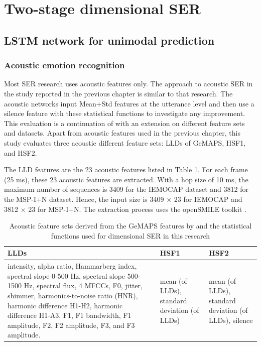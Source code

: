 \section{Two-stage dimensional SER}

\subsection{LSTM network for unimodal prediction}
\subsubsection{Acoustic emotion recognition}

Most SER research uses acoustic features only. The approach to acoustic SER in
the study reported in the previous chapter is similar to that research. The
acoustic networks input Mean+Std features at the utterance level and then use
a silence feature with these statistical functions to investigate any
improvement.  This evaluation is a continuation of \cite{Atmaja2020f} with an
extension on different feature sets and datasets.  Apart from acoustic features
used in the previous chapter, this study evaluates three acoustic different
feature sets: LLDs of GeMAPS, HSF1, and HSF2.

The LLD features are the 23 acoustic features listed in Table
\ref{tab:aco_feature}. For each frame (25 ms), these 23 acoustic features are
extracted. With a hop size of 10 ms, the maximum number of sequences is 3409
for the IEMOCAP dataset and 3812 for the MSP-I+N dataset. Hence, the input size
is 3409 $\times$ 23 for IEMOCAP and 3812 $\times$ 23 for MSP-I+N. The
extraction process uses the openSMILE toolkit \cite{Eyben2016open}.

\begin{table}
\caption{Acoustic feature sets derived from the GeMAPS features by \cite{Eyben}
and the statistical functions used for dimensional SER in this research}
    \begin{center}
\begin{tabular}{p{6cm} p{4cm} p{4cm}}
    \hline
LLDs & HSF1 & HSF2 \\
\hline \hline
intensity, alpha ratio, Hammarberg index, spectral slope 0-500 Hz, spectral
slope 500-1500 Hz, spectral flux, 4 MFCCs, F0, jitter, shimmer,
harmonics-to-noise ratio (HNR), harmonic difference H1-H2, harmonic difference
H1-A3, F1, F1 bandwidth, F1 amplitude, F2, F2 amplitude, F3, and F3 amplitude.
& mean (of LLDs), standard deviation (of LLDs) & mean (of LLDs), standard
deviation (of LLDs), silence \\
    \hline
    \end{tabular}
    \end{center}
    \label{tab:aco_feature}
   \end{table}

